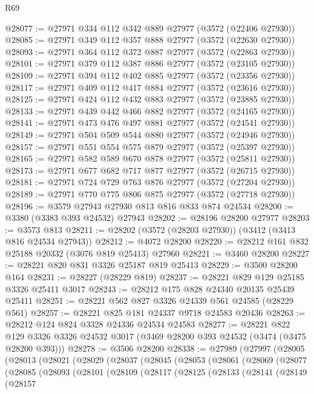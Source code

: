 \begin{lexlean}{R69}
\begin{coremodule}
@28077 := @27971 @334 @112 @342 @889 @27977 (@3572 (@22406 @27930))
@28085 := @27971 @349 @112 @357 @888 @27977 (@3572 (@22630 @27930))
@28093 := @27971 @364 @112 @372 @887 @27977 (@3572 (@22863 @27930))
@28101 := @27971 @379 @112 @387 @886 @27977 (@3572 (@23105 @27930))
@28109 := @27971 @394 @112 @402 @885 @27977 (@3572 (@23356 @27930))
@28117 := @27971 @409 @112 @417 @884 @27977 (@3572 (@23616 @27930))
@28125 := @27971 @424 @112 @432 @883 @27977 (@3572 (@23885 @27930))
@28133 := @27971 @439 @442 @466 @882 @27977 (@3572 (@24165 @27930))
@28141 := @27971 @473 @476 @497 @881 @27977 (@3572 (@24541 @27930))
@28149 := @27971 @504 @509 @544 @880 @27977 (@3572 (@24946 @27930))
@28157 := @27971 @551 @554 @575 @879 @27977 (@3572 (@25397 @27930))
@28165 := @27971 @582 @589 @670 @878 @27977 (@3572 (@25811 @27930))
@28173 := @27971 @677 @682 @717 @877 @27977 (@3572 (@26715 @27930))
@28181 := @27971 @724 @729 @763 @876 @27977 (@3572 (@27204 @27930))
@28189 := @27971 @770 @775 @806 @875 @27977 (@3572 (@27718 @27930))
@28196 := @3579 @27943 @27930 @813 @816 @833 @874 @24534
@28200 := @3380 (@3383 @393 @24532) @27943
@28202 := @28196 @28200 @27977
@28203 := @3573 @813
@28211 := @28202 (@3572 (@28203 @27930)) (@3412 (@3413 @816 @24534 @27943))
@28212 := @4072 @28200
@28220 := @28212 @161 @832 @25188 @20332 (@3076 @819 @25413) @27960
@28221 := @3460 @28200
@28227 := @28221 @820 @831 @3326 @25187 @819 @25413
@28229 := @3500 @28200 @164
@28231 := @28227 (@28229 @819)
@28237 := @28221 @829 @129 @25185 @3326 @25411 @3017
@28243 := @28212 @175 @828 @24340 @20135 @25439 @25411
@28251 := @28221 @562 @827 @3326 @24339 @561 @24585 (@28229 @561)
@28257 := @28221 @825 @181 @24337 @9718 @24583 @20436
@28263 := @28212 @124 @824 @3328 @24336 @24534 @24583
@28277 := @28221
    @822
    @129
    @3326
    @3326
    @24532
    @3017
    (@3469 @28200 @393 @24532 (@3474 (@3475 @28200 @393)))
@28278 := @3506 @28200
@28338 := @27989
    (@27997
      (@28005
        (@28013
          (@28021
            (@28029
              (@28037
                (@28045
                  (@28053
                    (@28061
                      (@28069
                        (@28077
                          (@28085
                            (@28093
                              (@28101
                                (@28109
                                  (@28117
                                    (@28125
                                      (@28133
                                        (@28141
                                          (@28149
                                            (@28157

\end{coremodule}
\end{lexlean}
